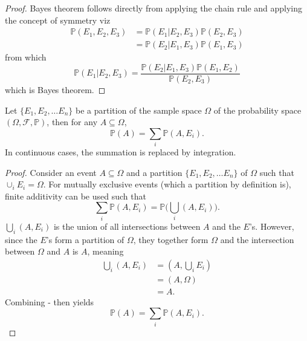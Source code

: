 \begin{proof}
	Bayes theorem follows directly from applying the chain rule and applying the concept of symmetry viz
	\begin{equation}
		\begin{split}
			\mathbb{P}(E_1,E_2,E_3) &= \mathbb{P}(E_1| E_2,E_3)\mathbb{P}(E_2,E_3) \\
			& = \mathbb{P}(E_2|E_1,E_3)\mathbb{P}(E_1,E_3)
		\end{split}
		\label{eq:c2}
	\end{equation}
	from which
	\begin{equation}
		\mathbb{P}(E_1| E_2,E_3) = \frac{\mathbb{P}(E_2| E_1,E_3)\mathbb{P}(E_1,E_2)}{\mathbb{P}(E_2,E_3)}
	\end{equation}
	which is Bayes theorem.
\end{proof}


\begin{theorem}
	\label{theorem:law_of_total_probability}
	Let $\{E_1,E_2,\dots E_n\}$ be a partition of the sample space $\Omega$ of the probability space $(\Omega, \mathcal{F}, \mathbb{P})$, then for any $A\subseteq \Omega$,
	\begin{equation}
		\mathbb{P}(A) = \sum_{i} \mathbb{P}(A,E_i).
		\label{eq:marg}
	\end{equation}
	In continuous cases, the summation is replaced by integration.
\end{theorem}

\begin{proof}
	Consider an event $A\subseteq \Omega$ and a partition $\{E_1,E_2,\dots E_n\}$ of $\Omega$ such that $\cup_{i}E_i=\Omega$. For mutually exclusive events (which a partition by definition is), finite additivity can be used such that
	\begin{equation}
		\sum_{i}\mathbb{P}(A,E_i) = \mathbb{P}\bigg(\bigcup_{i}(A,E_i)\bigg).
		\label{eq:qq1}
	\end{equation} 
	$\bigcup_{i}(A,E_i)$ is the union of all intersections between $A$ and the $E$'s. However, since the $E$'s form a partition of $\Omega$, they together form $\Omega$ and the intersection between $\Omega$ and $A$ is $A$, meaning
	\begin{equation}
		\begin{split}
			\bigcup_{i}(A,E_i)  &= (A,\bigcup_{i}E_i)\\
			&= (A,\Omega)\\
			& =A.
		\end{split}
	\label{eq:qq2}
	\end{equation}
	Combining - then yields
	\begin{equation}
		\mathbb{P}(A) = \sum_{i} \mathbb{P}(A, E_i).
	\end{equation}
	
\end{proof}

